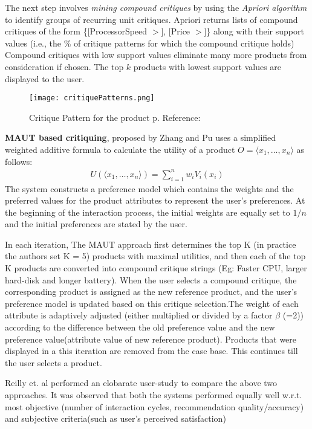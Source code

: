 \documentclass{llncs}
\begin{document}
The next step involves \textit{mining compound critiques} by using the \textit{Apriori algorithm} to identify groups of recurring unit critiques. Apriori returns lists of compound critiques of the form \{[ProcessorSpeed $>$], [Price $>$]\} along with their support values (i.e., the \% of critique patterns for which the compound critique holds)
Compound critiques with low support values eliminate many more products from consideration if chosen. The top $k$ products with lowest support values are displayed to the user.

\begin{figure}
    \texttt{[image: critiquePatterns.png]}
  \caption{Critique Pattern for the product p. Reference: \cite{reilly2007evaluating}}
  \centering
\label{fig:critiquePatterns}
\end{figure}

\textbf{MAUT based critiquing}, proposed by Zhang and Pu \cite{zhang}
uses a simplified weighted additive formula to calculate the utility of a product $O = \langle x_1,\hdots,x_n\rangle$ as follows:
\begin{align*}
U(\langle x_1,\hdots,x_n \rangle) = \sum_{i=1}^n w_iV_i(x_i)
\end{align*}
The system constructs a preference model which contains the weights and the preferred values for the product attributes to represent the user's preferences. At the beginning of the interaction process, the initial weights are equally set to $1/n$ and the initial preferences are stated by the user.

In each iteration,
The MAUT approach first determines the top K (in practice the authors set K = 5) products with maximal utilities, and then each of the top K products are converted into compound critique strings (Eg: Faster CPU, larger hard-disk and longer battery).
When the user selects a compound critique, the corresponding product is assigned as the new reference product, and the user's preference model is updated based on this critique selection.The weight of each attribute is adaptively adjusted (either multiplied or divided by a factor $\beta$ (=2)) according to the difference between the old preference value and the new preference value(attribute value of new reference product). 
Products that were displayed in a this iteration are removed from the case base. 
This continues till the user selects a product.

Reilly et. al \cite{reilly2007evaluating} performed an elobarate user-study to compare the above two approaches. It was observed that both the systems performed equally well w.r.t. most objective (number of interaction cycles, recommendation quality/accuracy) and subjective criteria(such as user's perceived satisfaction) 
\end{document}
